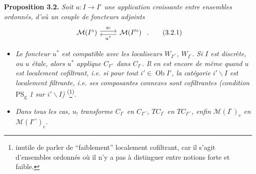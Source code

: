\textbf{Proposition 3.2.} \textit{Soit $u:I\longrightarrow I'$ une application croissante entre ensembles ordonnés, d'où un couple de foncteurs adjoints}
\[
\begin{tikzcd}
\mathcal{M}(I^\circ) \arrow[r, shift left, "u_{!}"] & \mathcal{M}(I'^\circ) \arrow[l, shift left, "u^*"]
\end{tikzcd}\ .
\tag*{(3.2.1)}
\]
\begin{itemize}[leftmargin=2.5em]
\item[a)] \textit{Le foncteur $u^*$ est compatible avec les localiseurs $W_{I'^\circ}$, $W_{I^\circ}$. Si $I$ est discrète, ou $u$ étale, alors $u^*$ applique $C_{I'^\circ}$ dans $C_{I^\circ}$. Il en est encore de même quand $u$ est localement cofiltrant, i.e. si pour tout $i'\in\operatorname{Ob}I'$, la catégorie $i'\backslash I$ est localement filtrante, i.e. ses composantes connexes sont cofiltrantes (condition $\mathrm{PS}_{\mathrm{g}}$ \textup{1} sur $i'\backslash I$)} \textsuperscript{(}\footnote[16]{inutile de parler de ``faiblement'' localement cofiltrant, car il s'agit d'ensembles ordonnés où il n'y a pas à distinguer entre notions forte et faible.}\textsuperscript{)}.
\item[b)] \textit{Dans tous les cas, $u_!$ transforme $C_{I^\circ}$ en $C_{I'^\circ}$, $TC_{I^\circ}$ en $TC_{I'^\circ}$, enfin $\mathcal{M}(I^\circ)_{\mathrm{c}}$ en $\mathcal{M}(I'^\circ)_{\mathrm{c}}$.}
\end{itemize}

